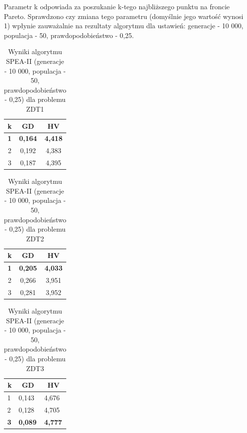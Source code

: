 \documentclass{classrep}
\begin{document}
Parametr k odpowiada za poszukanie k-tego najbliższego punktu na froncie Pareto. Sprawdzono czy zmiana tego parametru (domyślnie jego wartość wynosi 1) wpłynie zauważalnie na rezultaty algorytmu dla ustawień: generacje - 10 000, populacja - 50, prawdopodobieństwo - 0,25.

\begin{table}[H]
\centering
\caption{Wyniki algorytmu SPEA-II (generacje - 10 000, populacja - 50, prawdopodobieństwo - 0,25) dla problemu ZDT1}
\label{tab:SPEAII_e_ZDT1}
\begin{tabular}{|c|c|c|}
\hline
\textbf{k} & \textbf{GD} & \textbf{HV} \\ \hline
\textbf{1} & \textbf{0,164} & \textbf{4,418} \\ \hline
2 & 0,192 & 4,383 \\ \hline
3 & 0,187 & 4,395 \\ \hline
\end{tabular}
\end{table}

\begin{table}[H]
\centering
\caption{Wyniki algorytmu SPEA-II (generacje - 10 000, populacja - 50, prawdopodobieństwo - 0,25) dla problemu ZDT2}
\label{tab:SPEAII_e_ZDT2}
\begin{tabular}{|c|c|c|}
\hline
\textbf{k} & \textbf{GD} & \textbf{HV} \\ \hline
\textbf{1} & \textbf{0,205} & \textbf{4,033} \\ \hline
2 & 0,266 & 3,951 \\ \hline
3 & 0,281 & 3,952 \\ \hline
\end{tabular}
\end{table}

\begin{table}[H]
\centering
\caption{Wyniki algorytmu SPEA-II (generacje - 10 000, populacja - 50, prawdopodobieństwo - 0,25) dla problemu ZDT3}
\label{tab:SPEAII_e_ZDT3}
\begin{tabular}{|l|l|l|}
\hline
\multicolumn{1}{|c|}{\textbf{k}} & \multicolumn{1}{c|}{\textbf{GD}} & \multicolumn{1}{c|}{\textbf{HV}} \\ \hline
1 & 0,143 & 4,676 \\ \hline
2 & 0,128 & 4,705 \\ \hline
\textbf{3} & \textbf{0,089} & \textbf{4,777} \\ \hline
\end{tabular}
\end{table}
\end{document}
